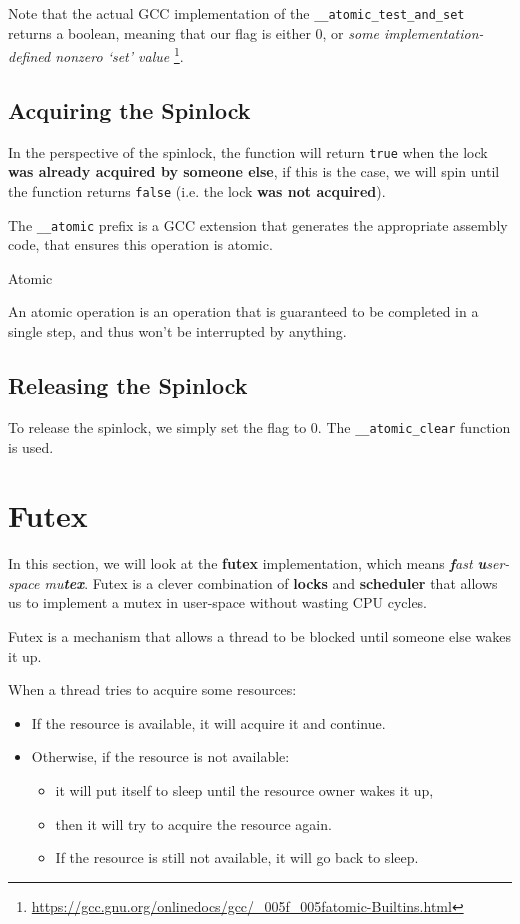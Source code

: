 Note that the actual GCC implementation of the \texttt{\_\_atomic\_test\_and\_set} returns a
boolean, meaning that our flag is either 0, or \textit{some implementation-defined nonzero `set' value}
\footnote{\url{https://gcc.gnu.org/onlinedocs/gcc/_005f_005fatomic-Builtins.html}}.

\subsection{Acquiring the Spinlock}

In the perspective of the spinlock, the function will return \texttt{true} when the lock
\textbf{was already acquired by someone else}, if this is the case, we will spin until the
function returns \texttt{false} (i.e. the lock \textbf{was not acquired}).

The \texttt{\_\_atomic} prefix is a GCC extension that generates the appropriate assembly code,
that ensures this operation is atomic.

\begin{note*}{Atomic}
    \item An atomic operation is an operation that is guaranteed to be completed in a single step,
    and thus won't be interrupted by anything.
\end{note*}

\subsection{Releasing the Spinlock}

To release the spinlock, we simply set the flag to 0. The \texttt{\_\_atomic\_clear}
function is used.

\section{Futex}

In this section, we will look at the \textbf{futex} implementation, which means
\textit{\textbf{f}ast \textbf{u}ser-space mu\textbf{tex}}. Futex is a clever combination
of \textbf{locks} and \textbf{scheduler} that allows us to implement a mutex in user-space
without wasting CPU cycles.

Futex is a mechanism that allows a thread to be blocked until someone else wakes it up.

When a thread tries to acquire some resources:

\begin{itemize}
    \item If the resource is available, it will acquire it and continue.
    \item Otherwise, if the resource is not available:
          \begin{itemize}
              \item it will put itself to sleep until the resource owner wakes it up,
              \item then it will try to acquire the resource again.
              \item If the resource is still not available, it will go back to sleep.
          \end{itemize}
\end{itemize}

